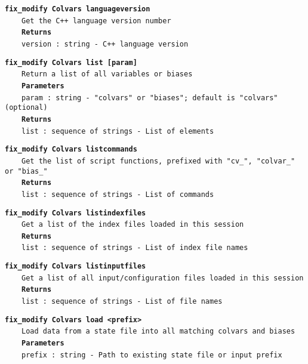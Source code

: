 \begin{mdexampleinput}{}
\texttt{\textbf{fix\_modify Colvars languageversion}}
\\
\-~~~~\texttt{Get the C++ language version number}
\\
\-~~~~\texttt{\textbf{Returns}}
\\
\-~~~~\texttt{version : string - C++ language version}
\end{mdexampleinput}
\begin{mdexampleinput}{}
\texttt{\textbf{fix\_modify Colvars list [param]}}
\\
\-~~~~\texttt{Return a list of all variables or biases}
\\
\-~~~~\texttt{\textbf{Parameters}}
\\
\-~~~~\texttt{param : string - "colvars" or "biases"; default is "colvars" (optional)}
\\
\-~~~~\texttt{\textbf{Returns}}
\\
\-~~~~\texttt{list : sequence of strings - List of elements}
\end{mdexampleinput}
\begin{mdexampleinput}{}
\texttt{\textbf{fix\_modify Colvars listcommands}}
\\
\-~~~~\texttt{Get the list of script functions, prefixed with "cv\_", "colvar\_" or "bias\_"}
\\
\-~~~~\texttt{\textbf{Returns}}
\\
\-~~~~\texttt{list : sequence of strings - List of commands}
\end{mdexampleinput}
\begin{mdexampleinput}{}
\texttt{\textbf{fix\_modify Colvars listindexfiles}}
\\
\-~~~~\texttt{Get a list of the index files loaded in this session}
\\
\-~~~~\texttt{\textbf{Returns}}
\\
\-~~~~\texttt{list : sequence of strings - List of index file names}
\end{mdexampleinput}
\begin{mdexampleinput}{}
\texttt{\textbf{fix\_modify Colvars listinputfiles}}
\\
\-~~~~\texttt{Get a list of all input/configuration files loaded in this session}
\\
\-~~~~\texttt{\textbf{Returns}}
\\
\-~~~~\texttt{list : sequence of strings - List of file names}
\end{mdexampleinput}
\begin{mdexampleinput}{}
\texttt{\textbf{fix\_modify Colvars load <prefix>}}
\\
\-~~~~\texttt{Load data from a state file into all matching colvars and biases}
\\
\-~~~~\texttt{\textbf{Parameters}}
\\
\-~~~~\texttt{prefix : string - Path to existing state file or input prefix}
\end{mdexampleinput}
